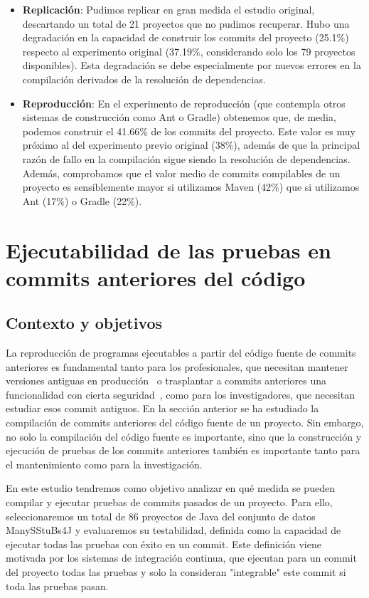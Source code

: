 \begin{itemize}
    \item \textbf{Replicación}: Pudimos replicar en gran medida el estudio original, descartando un total de 21 proyectos que no pudimos recuperar. 
    Hubo una degradación en la capacidad de construir los commits del proyecto (25.1\%) respecto al experimento original (37.19\%, considerando solo los 79 proyectos disponibles). Esta degradación se debe especialmente por nuevos errores en la compilación derivados de la resolución de dependencias.
    \item \textbf{Reproducción}: En el experimento de reproducción (que contempla otros sistemas de construcción como Ant o Gradle) obtenemos que, de media, podemos construir el 41.66\% de los commits del proyecto. Este valor es muy próximo al del experimento previo original (38\%), además de que la principal razón de fallo en la compilación sigue siendo la resolución de dependencias. Además, comprobamos que el valor medio de commits compilables de un proyecto es sensiblemente mayor si utilizamos Maven (42\%) que si utilizamos Ant (17\%) o Gradle (22\%).
\end{itemize}

\section{Ejecutabilidad de las pruebas en commits anteriores del código}
\label{sec:resumen:testability}

\subsection{Contexto y objetivos}

La reproducción de programas ejecutables a partir del código fuente de commits anteriores es fundamental tanto para los profesionales, que necesitan mantener versiones antiguas en producción~\cite{bartelsoftware} o trasplantar a commits anteriores una funcionalidad con cierta seguridad~\cite{tian2017mining}, como para los investigadores, que necesitan estudiar esos commit antiguos. 
En la sección anterior se ha estudiado la compilación de commits anteriores del código fuente de un proyecto.
Sin embargo, no solo la compilación del código fuente es importante, sino que la construcción y ejecución de pruebas de los commits anteriores también es importante tanto para el mantenimiento como para la investigación.

En este estudio tendremos como objetivo analizar en qué medida se pueden compilar y ejecutar pruebas de commits pasados de un proyecto. 
Para ello, seleccionaremos un total de 86 proyectos de Java del conjunto de datos ManySStuBs4J y evaluaremos su testabilidad, definida como la capacidad de ejecutar todas las pruebas con éxito en un commit. Este definición viene motivada por los sistemas de integración continua, que ejecutan para un commit del proyecto todas las pruebas y solo la consideran "integrable" este commit si toda las pruebas pasan.

